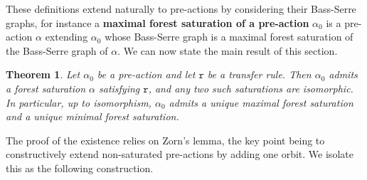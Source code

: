 \documentclass[12pt]{article}
\numberwithin{equation}{section}
\newtheorem{theorem}[equation]{Theorem}
\theoremstyle{definition}
\newcommand{\trrule}{\mathtt{r}}
\begin{document}
	These definitions extend naturally to pre-actions by considering their Bass-Serre graphs,
	for instance a \textbf{maximal forest saturation of a pre-action} \(\alpha_0\) is
	a pre-action \(\alpha\) extending \(\alpha_0\) whose Bass-Serre graph is 
	a maximal forest saturation of the Bass-Serre graph of \(\alpha\). 
	We can now state the main result of this section.

	\begin{theorem}\label{thm: forest saturation ruled}
		Let \( \alpha_0 \) be a pre-action and
		let $\trrule$ be a transfer rule. Then 
		\( \alpha_0 \) admits a forest saturation \( \alpha \) satisfying $\trrule$,
		and any two such saturations are isomorphic.
		In particular, up to isomorphism, \( \alpha_0 \) admits a unique maximal forest saturation and a unique minimal forest saturation.
	\end{theorem}

	The proof of the existence relies on Zorn's lemma, the key point being to constructively
	extend non-saturated pre-actions by adding one orbit. We isolate this as the following construction.\\
\end{document}
